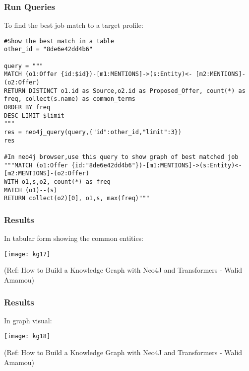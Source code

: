 \begin{frame}[fragile]\frametitle{Run Queries}

To find the best job match to a target profile:

\begin{lstlisting}
#Show the best match in a table
other_id = "8de6e42dd4b6"

query = """
MATCH (o1:Offer {id:$id})-[m1:MENTIONS]->(s:Entity)<- [m2:MENTIONS]-(o2:Offer)  
RETURN DISTINCT o1.id as Source,o2.id as Proposed_Offer, count(*) as freq, collect(s.name) as common_terms
ORDER BY freq
DESC LIMIT $limit
"""
res = neo4j_query(query,{"id":other_id,"limit":3})
res

#In neo4j browser,use this query to show graph of best matched job
"""MATCH (o1:Offer {id:"8de6e42dd4b6"})-[m1:MENTIONS]->(s:Entity)<- [m2:MENTIONS]-(o2:Offer) 
WITH o1,s,o2, count(*) as freq
MATCH (o1)--(s)
RETURN collect(o2)[0], o1,s, max(freq)"""
\end{lstlisting}

\end{frame}

\begin{frame}[fragile]\frametitle{Results}

In tabular form showing the common entities:

			\begin{center}
			\texttt{[image: kg17]}
			\end{center}	
			
			{\tiny (Ref: How to Build a Knowledge Graph with Neo4J and Transformers - Walid Amamou)}	
			
\end{frame}

\begin{frame}[fragile]\frametitle{Results}

In graph visual:

			\begin{center}
			\texttt{[image: kg18]}
			\end{center}	
			
			{\tiny (Ref: How to Build a Knowledge Graph with Neo4J and Transformers - Walid Amamou)}	
			
\end{frame}

